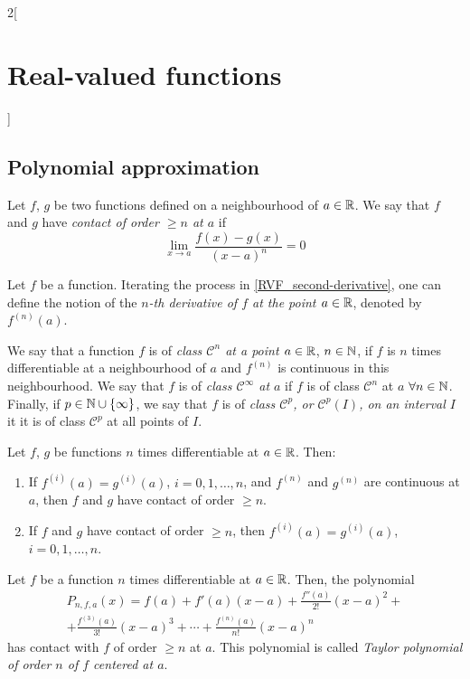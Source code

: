 \documentclass[../../../main.tex]{subfiles}
\begin{document}
\begin{multicols}{2}[\section{Real-valued functions}]
  \subsection{Polynomial approximation}
  \begin{definition}
    Let $f$, $g$ be two functions defined on a neighbourhood of $a\in\mathbb{R}$.  We say that $f$ and $g$ have \textit{contact of order $\geq n$ at $a$} if $$\lim_{x\to a}\frac{f(x)-g(x)}{{(x-a)}^n}=0$$
  \end{definition}
  \begin{definition}
    Let $f$ be a function. Iterating the process in \cref{RVF_second-derivative}, one can define the notion of the \textit{$n$-th derivative of $f$ at the point $a\in\mathbb{R}$}, denoted by $f^{(n)}(a)$.
  \end{definition}
  \begin{definition}
    We say that a function $f$ is of \textit{class $\mathcal{C}^n$ at a point $a\in\mathbb{R}$}, $n\in\mathbb{N}$, if $f$ is $n$ times differentiable at a neighbourhood of $a$ and $f^{(n)}$ is continuous in this neighbourhood. We say that $f$ is of \textit{class $\mathcal{C}^\infty$ at $a$} if $f$ is of class $\mathcal{C}^n$ at $a$ $\forall n\in\mathbb{N}$. Finally, if $p\in\mathbb{N}\cup\{\infty\}$, we say that $f$ is of \textit{class $\mathcal{C}^p$, or $\mathcal{C}^p(I)$, on an interval $I$} it it is of class $\mathcal{C}^p$ at all points of $I$.
  \end{definition}
  \begin{lemma}
    Let $f$, $g$ be functions $n$ times differentiable at $a\in\mathbb{R}$. Then:
    \begin{enumerate}
      \item If $f^{(i)}(a)=g^{(i)}(a)$, $i=0,1,\ldots,n$, and $f^{(n)}$ and $g^{(n)}$ are continuous at $a$, then $f$ and $g$ have contact of order $\geq n$.
      \item If $f$ and $g$ have contact of order $\geq n$, then $f^{(i)}(a)=g^{(i)}(a)$, $i=0,1,\ldots,n$.
    \end{enumerate}
  \end{lemma}
  \begin{theorem}
    Let $f$ be a function $n$ times differentiable at $a\in\mathbb{R}$. Then, the polynomial
    \begin{multline*}
      P_{n,f,a}(x)=f(a)+f'(a)(x-a)+\frac{f''(a)}{2!}{(x-a)}^2+\\+\frac{f^{(3)}(a)}{3!}{(x-a)}^3+\cdots+\frac{f^{(n)}(a)}{n!}{(x-a)}^n
    \end{multline*}
    has contact with $f$ of order $\geq n$ at $a$. This polynomial is called \textit{Taylor polynomial of order $n$ of $f$ centered at $a$}.

\end{theorem}
\end{multicols}
\end{document}
